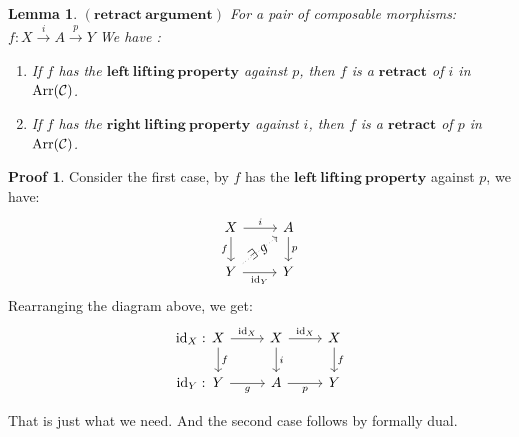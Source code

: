 \documentclass[a4paper]{article}
\theoremstyle{plain}
\newtheorem{lem}[thm]{Lemma}
\theoremstyle{definition}
\newtheorem*{prf}{Proof}
\theoremstyle{remark}
\newcommand{\mc}[1]{\mathcal{#1}}
\newcommand{\mbf}[1]{\mathbf{#1}}
\newcommand{\mcC}{\mc C}
\newcommand{\id}{\mathrm{id}}
\newcommand{\E}{\exists}
\DeclareMathOperator{\Arr}{\rm{Arr}}
\begin{document}
        \begin{lem}
            $\mbf{(retract\ argument)}$ For a pair of composable morphisms:
            $f : X \overset{i}{\longrightarrow} A \overset{p}{\longrightarrow}  Y$
            We have :
            \begin{enumerate}
                \item If $f$ has the $\mbf{left\ lifting\ property}$ against $p$, then $f$ is a $\mbf{retract}$ of $i$ in $\Arr(\mcC)$.
                \item If $f$ has the $\mbf{right\ lifting\ property}$ against $i$, then $f$ is a $\mbf{retract}$ of $p$ in $\Arr(\mcC)$.
            \end{enumerate}
        \end{lem}

        \begin{prf}
            Consider the first case, by $f$ has the $\mbf{left\ lifting\ property}$ against $p$, we have:
            \[\begin{tikzcd}
                X & A \\
                Y & Y
                \arrow["f"', from=1-1, to=2-1]
                \arrow["i", from=1-1, to=1-2]
                \arrow["p", from=1-2, to=2-2]
                \arrow["{\id_Y}"', from=2-1, to=2-2]
                \arrow["{\E\ g}"{marking, pos=0.45}, dotted, from=2-1, to=1-2]
            \end{tikzcd}\]
            Rearranging the diagram above, we get:
            \[\begin{tikzcd}
                X & X & X \\
                Y & A & Y
                \arrow["f", from=1-1, to=2-1]
                \arrow["\id_Y : \hspace*{2.85cm}"{marking}, "g"', from=2-1, to=2-2]
                \arrow["p"', from=2-2, to=2-3]
                \arrow["\id_X : \hspace*{2.85cm}"{marking}, "{\id_X}", from=1-1, to=1-2]
                \arrow["i", from=1-2, to=2-2]
                \arrow["{\id_X}", from=1-2, to=1-3]
                \arrow["f", from=1-3, to=2-3]
            \end{tikzcd}\]
            \par That is just what we need.
            And the second case follows by formally dual.
        \end{prf}
\end{document}
